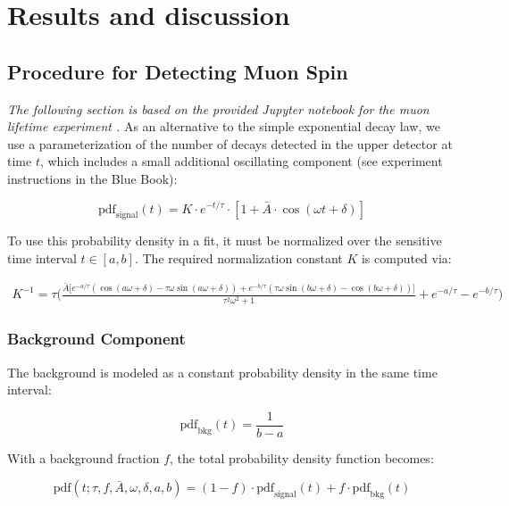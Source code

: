 \chapter{Results and discussion}
\section*{Procedure for Detecting Muon Spin}
\textit{The following section is based on the provided Jupyter notebook for the muon lifetime experiment \cite{Jupyter}.}
As an alternative to the simple exponential decay law, we use a parameterization of the number of decays detected in the upper detector at time \( t \), which includes a small additional oscillating component (see experiment instructions in the Blue Book):

\begin{equation}
  \mathrm{pdf}_{\mathrm{signal}}(t) = 
  K \cdot e^{-t/\tau} \cdot \left[1 + \bar{A} \cdot \cos(\omega t + \delta) \right]
\end{equation}

To use this probability density in a fit, it must be normalized over the sensitive time interval \( t \in [a, b] \). The required normalization constant \( K \) is computed via:

{\scriptsize
\begin{align}
  K^{-1}
  = \tau \Bigg( 
    \frac{ \bar{A} \Big[ 
      e^{-a/\tau} \left( \cos(a \omega + \delta) - \tau \omega \sin(a \omega + \delta) \right) 
      + e^{-b/\tau} \left( \tau \omega \sin(b \omega + \delta) - \cos(b \omega + \delta) \right)
    \Big] }{ \tau^2 \omega^2 + 1 }
  + e^{-a/\tau} - e^{-b/\tau}
  \Bigg)
\end{align}
}




\subsection*{Background Component}

The background is modeled as a constant probability density in the same time interval:

\begin{equation}
  \mathrm{pdf}_{\mathrm{bkg}}(t) = \frac{1}{b - a}
\end{equation}

With a background fraction \( f \), the total probability density function becomes:

\begin{equation}
  \mathrm{pdf}(t; \tau, f, \bar{A}, \omega, \delta, a, b) = 
  (1 - f) \cdot \mathrm{pdf}_{\mathrm{signal}}(t) + 
  f \cdot \mathrm{pdf}_{\mathrm{bkg}}(t)
\end{equation}

